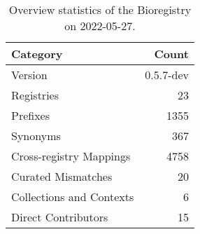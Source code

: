 \begin{table}
\centering
\caption{Overview statistics of the Bioregistry on 2022-05-27.}
\label{tab:bioregistry-summary}
\begin{tabular}{lr}
\toprule
                Category &     Count \\
\midrule
                 Version & 0.5.7-dev \\
              Registries &        23 \\
                Prefixes &      1355 \\
                Synonyms &       367 \\
 Cross-registry Mappings &      4758 \\
      Curated Mismatches &        20 \\
Collections and Contexts &         6 \\
     Direct Contributors &        15 \\
\bottomrule
\end{tabular}
\end{table}
